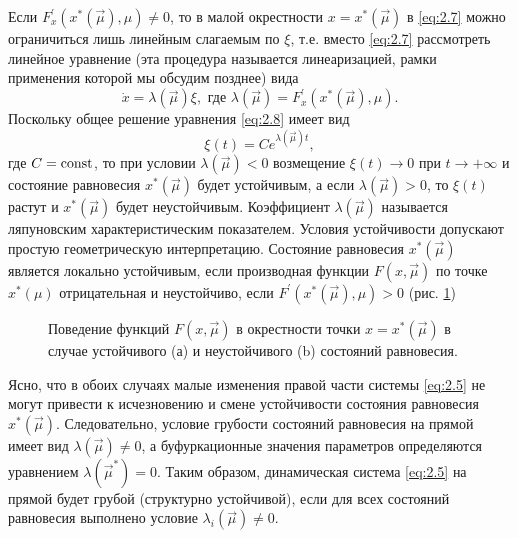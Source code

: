 Если $F^\prime_x (x^*(\vec \mu), \mu) \neq 0$, то в малой окрестности $x=x^*(\vec \mu)$ в  \eqref{eq:2.7} можно ограничиться лишь линейным слагаемым по $\xi$, т.е. вместо \eqref{eq:2.7} рассмотреть линейное уравнение (эта процедура называется линеаризацией, рамки применения которой мы обсудим позднее) вида
\begin{equation}
	\label{eq:2.8}
	\dot x = \lambda(\vec \mu) \xi, \text{ где } \lambda(\vec \mu) = F^\prime_x (x^*(\vec \mu), \mu).
\end{equation}
Поскольку общее решение уравнения \eqref{eq:2.8} имеет вид
\begin{equation}
	\label{eq:}
	\xi(t) = Ce^{\lambda(\vec \mu)t},
\end{equation}
где $C=\textrm{const}$, то при условии $\lambda(\vec \mu)<0$ возмещение $\xi(t) \rightarrow 0$ при $t \rightarrow + \infty$ и состояние равновесия $x^*(\vec \mu)$ будет устойчивым, а если $\lambda(\vec \mu) > 0 $, то $\xi(t)$ растут и $x^*(\vec \mu)$ будет неустойчивым. Коэффициент $\lambda (\vec \mu)$ называется ляпуновским характеристическим показателем. Условия устойчивости допускают простую геометрическую интерпретацию. Состояние равновесия $x^*(\vec \mu)$ является локально устойчивым, если производная функции $F(x, \vec \mu)$ по точке $x^*(\mu)$ отрицательная и неустойчиво, если $F^\prime(x^*(\vec \mu), \mu)>0$ (рис. \ref{fig:2.3}) 

\begin{figure}[h!]
	\centering
	\begin{minipage}{0.49\linewidth}
		\centering
		\def\svgwidth{\linewidth}
		
		\label{fig:2.3a}
	\end{minipage}
	\hfill{}
	\begin{minipage}{0.49\linewidth}
		\centering
		\def\svgwidth{\linewidth}
		
		\label{fig:2.3b}
	\end{minipage}
	\caption{Поведение функций $F(x, \vec \mu)$ в окрестности точки $x=x^*(\vec \mu)$ в случае устойчивого (а) и неустойчивого (b) состояний равновесия.}
	\label{fig:2.3}
\end{figure}

Ясно, что в обоих случаях малые изменения правой части системы \eqref{eq:2.5} не могут привести к исчезновению и смене устойчивости состояния равновесия $x^*(\vec \mu)$. Следовательно, условие грубости состояний равновесия на прямой имеет вид $\lambda(\vec \mu) \neq 0$, а буфуркационные значения параметров определяются уравнением $\lambda(\vec \mu^*)=0$. Таким образом, динамическая система \eqref{eq:2.5} на прямой будет грубой (структурно устойчивой), если для всех состояний равновесия выполнено условие $\lambda_i (\vec \mu) \neq 0$.

